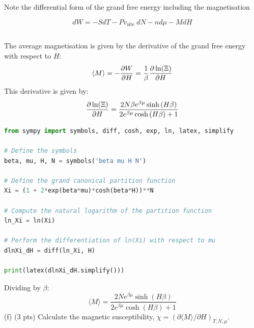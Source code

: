 \documentclass[12pt]{article}
\begin{document}
Note the differential form of the grand free energy including the magnetisation

$$
d W=-S d T-P v_{\text {site }} d N-n d \mu-M d H
$$
\subsection{}
The average magnetisation is given by the derivative of the grand free energy with respect to $H$:
\begin{equation}
  \langle M \rangle = -\pdv{W}{H} = \frac{1}{\beta } \pdv{\ln(\Xi)}{H}
\end{equation}
This derivative is given by:
\begin{equation}
  \pdv{\ln(\Xi)}{H} = \frac{2 N \beta e^{\beta \mu} \sinh{\left(H \beta \right)}}{2 e^{\beta \mu} \cosh{\left(H \beta \right)} + 1}
\end{equation}
\begin{lstlisting}[language=Python]
from sympy import symbols, diff, cosh, exp, ln, latex, simplify

# Define the symbols
beta, mu, H, N = symbols('beta mu H N')

# Define the grand canonical partition function
Xi = (1 + 2*exp(beta*mu)*cosh(beta*H))**N

# Compute the natural logarithm of the partition function
ln_Xi = ln(Xi)

# Perform the differentiation of ln(Xi) with respect to mu
dlnXi_dH = diff(ln_Xi, H)

print(latex(dlnXi_dH.simplify()))

\end{lstlisting}
Dividing by $\beta$:
\begin{equation}
  \langle M \rangle = \frac{2N e^{\beta \mu} \sinh{\left(H \beta \right)}}{2 e^{\beta \mu} \cosh{\left(H \beta \right)} + 1}
\end{equation}
(f) (3 pts) Calculate the magnetic susceptibility, $\chi=(\partial\langle M\rangle / \partial H)_{T, N, \mu}$.
\end{document}

